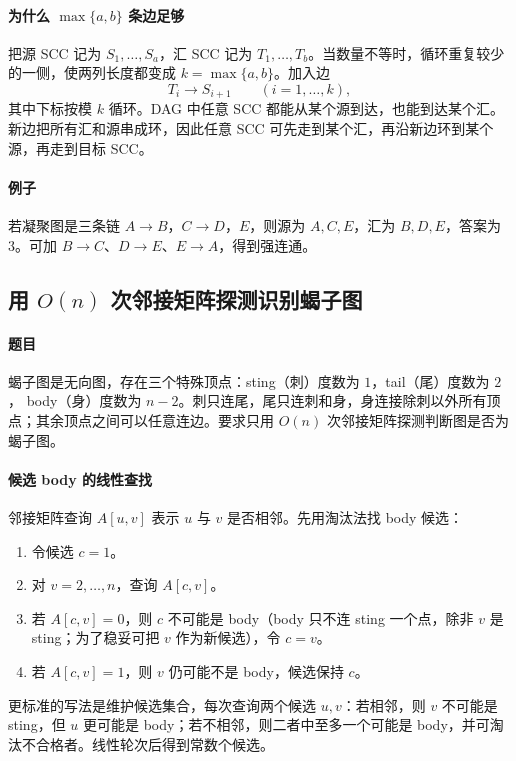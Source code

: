 \documentclass[UTF8,openany,12pt]{ctexbook}
\theoremstyle{remark}
\begin{document}
\paragraph{为什么 $\max\{a,b\}$ 条边足够}
把源 SCC 记为 $S_1,\dots,S_a$，汇 SCC 记为 $T_1,\dots,T_b$。当数量不等时，循环重复较少的一侧，使两列长度都变成 $k=\max\{a,b\}$。加入边
\[
  T_i\to S_{i+1}\qquad (i=1,\dots,k),
\]
其中下标按模 $k$ 循环。DAG 中任意 SCC 都能从某个源到达，也能到达某个汇。新边把所有汇和源串成环，因此任意 SCC 可先走到某个汇，再沿新边环到某个源，再走到目标 SCC。

\paragraph{例子}
若凝聚图是三条链 $A\to B$，$C\to D$，$E$，则源为 $A,C,E$，汇为
$B,D,E$，答案为 $3$。可加 $B\to C$、$D\to E$、$E\to A$，得到强连通。

\subsection[用 O(n) 次邻接矩阵探测识别蝎子图]{用 $O(n)$ 次邻接矩阵探测识别蝎子图}

\paragraph{题目}
蝎子图是无向图，存在三个特殊顶点：sting（刺）度数为 $1$，tail（尾）度数为 $2$，
body（身）度数为 $n-2$。刺只连尾，尾只连刺和身，身连接除刺以外所有顶点；其余顶点之间可以任意连边。要求只用 $O(n)$ 次邻接矩阵探测判断图是否为蝎子图。

\paragraph{候选 body 的线性查找}
邻接矩阵查询 $A[u,v]$ 表示 $u$ 与 $v$ 是否相邻。先用淘汰法找 body 候选：
\begin{enumerate}
  \item 令候选 $c=1$。
  \item 对 $v=2,\dots,n$，查询 $A[c,v]$。
  \item 若 $A[c,v]=0$，则 $c$ 不可能是 body（body 只不连 sting 一个点，除非 $v$ 是 sting；为了稳妥可把 $v$ 作为新候选），令 $c=v$。
  \item 若 $A[c,v]=1$，则 $v$ 仍可能不是 body，候选保持 $c$。
\end{enumerate}
更标准的写法是维护候选集合，每次查询两个候选 $u,v$：若相邻，则 $v$ 不可能是 sting，但 $u$ 更可能是 body；若不相邻，则二者中至多一个可能是 body，并可淘汰不合格者。线性轮次后得到常数个候选。
\end{document}
